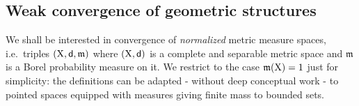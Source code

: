 \documentclass[11pt]{article}
\numberwithin{equation}{section}
\newcommand{\N}{\mathbb{N}}
\newcommand{\R}{\mathbb{R}}
\newcommand{\X}{{\rm X}}
\newcommand{\sfd}{{\sf d}}
\newcommand{\mm}{{\mathfrak m}}
\newcommand{\lims}{\varlimsup}
\newcommand{\limi}{\varliminf}
\newcommand{\E}{{\sf E}} %
\DeclareMathOperator*{\glimi}{{\Gamma-\limi}}
\DeclareMathOperator*{\glims}{\Gamma-\lims}
\begin{document}
%
%
%
%
%
%
%
%
%
%
%
%
%
%

\subsection{Weak convergence of geometric structures}\label{se:mGH}
We shall be interested in convergence of \emph{normalized} metric measure spaces, i.e.\ triples $(\X,\sfd,\mm)$ where $(\X,\sfd)$ is a complete and separable metric space and $\mm$ is a Borel probability measure on it. We restrict to the case $\mm(\X)=1$ just for simplicity: the definitions can be adapted - without deep conceptual work - to pointed spaces equipped with measures giving finite mass to bounded sets. 
\end{document}
